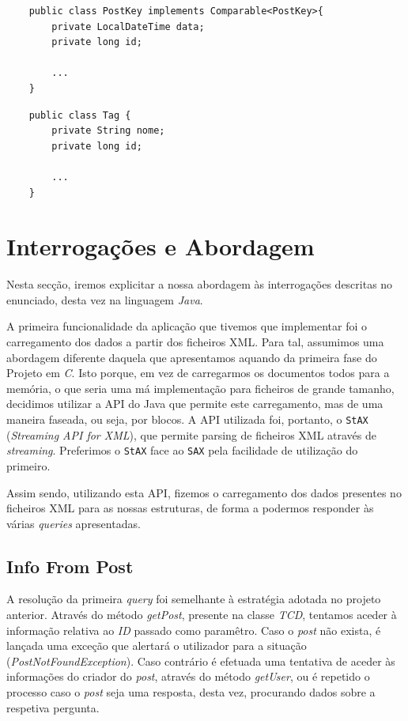 \documentclass[a4paper, 11pt, oneside]{article}
\begin{document}
\begin{lstlisting}
	public class PostKey implements Comparable<PostKey>{
	    private LocalDateTime data;
	    private long id;

	    ...
	}
\end{lstlisting}

\begin{lstlisting}
	public class Tag {
	    private String nome;
	    private long id;

	    ...
	}
\end{lstlisting}





\section{Interrogações e Abordagem}

\label{queries}
Nesta secção, iremos explicitar a nossa abordagem às interrogações descritas no enunciado,
desta vez na linguagem \textit{Java}.


A primeira funcionalidade da aplicação que tivemos que implementar foi o carregamento dos dados a partir dos ficheiros XML. Para tal, assumimos uma abordagem diferente daquela que apresentamos aquando da primeira fase do Projeto em \textit{C}. Isto porque, em vez de carregarmos os documentos todos para a memória, o que seria uma má implementação para ficheiros de grande tamanho, decidimos utilizar a API do Java que permite este carregamento, mas de uma maneira faseada, ou seja, por blocos. A API utilizada foi, portanto, o \texttt{StAX} (\textit{Streaming API for XML}), que permite parsing de ficheiros XML através de \textit{streaming}. Preferimos o \texttt{StAX} face ao \texttt{SAX} pela facilidade de utilização do primeiro.

Assim sendo, utilizando esta API, fizemos o carregamento dos dados presentes no ficheiros XML para as nossas estruturas, de forma a podermos responder às várias \textit{queries} apresentadas.


\subsection{Info From Post}

A resolução da primeira \textit{query} foi semelhante à estratégia adotada no projeto anterior. Através do método \textit{getPost}, presente na classe \textit{TCD}, tentamos aceder à informação relativa ao \textit{ID} passado como paramêtro. Caso o \textit{post} não exista, é lançada uma exceção que alertará o utilizador para a situação (\textit{PostNotFoundException}). Caso contrário é efetuada uma tentativa de aceder às informações do criador do \textit{post}, através do método \textit{getUser}, ou é repetido o processo caso o \textit{post} seja uma resposta, desta vez, procurando dados sobre a respetiva pergunta. 
\end{document}

